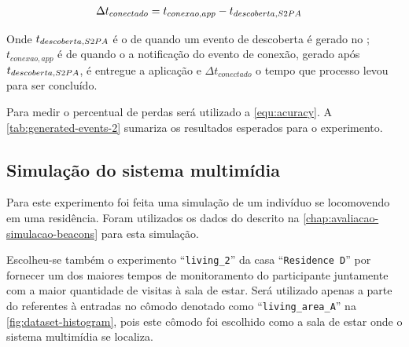 \begin{align}
	\label{equ:performance-ready}
	\Delta t_{conectado} &= t_{conexao,app} - t_{descoberta,S2PA}
\end{align}

Onde $t_{descoberta,S2PA}$ é o \timestamp de quando um evento de descoberta é gerado no \stwopa;
$t_{conexao,app}$ é \timestamp de quando o a notificação do evento de conexão, gerado após $t_{descoberta, S2PA}$, é entregue a aplicação e $\Delta t_{conectado}$ o tempo que processo levou para ser concluído.

Para medir o percentual de perdas será utilizado a \autoref{equ:acuracy}. A \autoref{tab:generated-events-2} sumariza os resultados esperados para o experimento.

\begin{table}[htb]
	\begin{center}
	\end{center}
\end{table}

\subsection{Simulação do sistema multimídia}

Para este experimento foi feita uma simulação de um indivíduo se locomovendo em uma residência. Foram utilizados os dados do \dataset descrito na \autoref{chap:avaliacao-simulacao-beacons} para esta simulação.

Escolheu-se também o experimento ``\texttt{living\_2}'' da casa ``\texttt{Residence D}'' por fornecer um dos maiores tempos de monitoramento do participante juntamente com a maior quantidade de visitas à sala de estar. Será utilizado apenas a parte do \dataset referentes à entradas no cômodo denotado como ``\texttt{living\_area\_A}'' na \autoref{fig:dataset-histogram}, pois este cômodo foi escolhido como a sala de estar onde o sistema multimídia se localiza.

